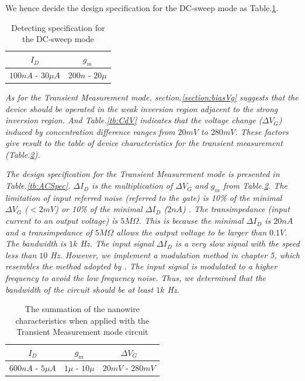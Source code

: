 We hence decide the design specification for the DC-sweep mode as Table.\ref{tb:DCspec}.
\begin{table}[!htbp]
    {\fontfamily{}\fontsize{10}{14}\selectfont
    \centering
    \begin{tabular}{c|c}
        $I_D$ & $g_m$ \\
        \hline
        $100n A$ - $30\mu A$ & $200n $ - $20\mu$ \\
    \end{tabular}
    \caption{Detecting specification for the DC-sweep mode}
    \label{tb:DCspec}
    }
\end{table}


\emph{As for the Transient Measurement mode, section.\ref{section:biasVg} suggests that the device should be operated in the weak inversion region adjacent to the strong inversion region.
And Table.\ref{tb:CdV} indicates that the voltage change ($\Delta V_G$) induced by concentration difference ranges from $20mV$ to $280mV$.
These factors give result to the table of device characteristics for the transient measurement (Table.\ref{tb:ACinput}).}

\emph{The design specification for the Transient Measurement mode is presented in Table.\ref{tb:ACSpec}.
$\Delta I_D$ is the multiplication of $\Delta V_G$ and $g_m$ from Table.\ref{tb:ACinput}.
The limitation of input referred noise (referred to the gate) is 10\% of the minimal $\Delta V_G$ ($< 2mV$) or 10\% of the minimal $\Delta I_D$ ($2n A$) .
The transimpedance (input current to an output voltage) is $5M \Omega$.
This is because the minimal $\Delta I_D$  is $20n A$ and a transimpedance of $5M \Omega$ allows the output voltage to be larger than $0.1 V$.
The bandwidth is $1k$ Hz.
The input signal $\Delta I_D$ is a very slow signal with the speed less than $10$ Hz.
However, we implement a modulation method in chapter 5, which resembles the method adopted by \cite{JLockin}.
The input signal is modulated to a higher frequency to avoid the low frequency noise.
Thus, we determined that the bandwidth of the circuit should be at least $1k$ Hz.
}

\begin{table}[!htbp]
    {\fontfamily{}\fontsize{10}{14}\selectfont
    \centering
    \begin{tabular}{c|c|c}
        $I_D$ & $g_m$ & $\Delta V_G$ \\
        \hline
        $600n A$ - $5\mu A$ & $1\mu $ - $10\mu$ & $20mV$ - $280mV$\\
    \end{tabular}
    \caption{The summation of the nanowire characteristics when applied with the Transient Measurement mode circuit}
    \label{tb:ACinput}
    }
\end{table}

